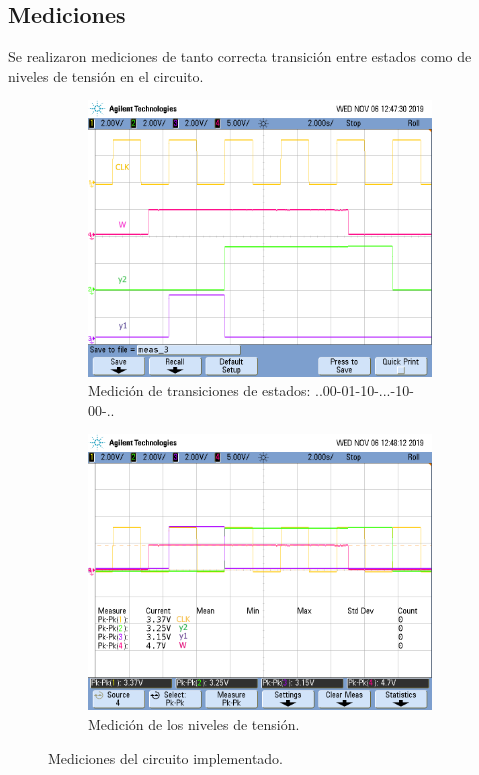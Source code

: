 \subsection{Mediciones}

Se realizaron mediciones de tanto correcta transición entre estados como de niveles de tensión en el circuito.

\begin{figure}[H]
\begin{subfigure}{0.49\textwidth}
\centering
\includegraphics[width=\textwidth,trim={0 3.35cm 0.1cm 1.75cm},clip]{ImagenesEjercicio3/states.png}
\caption{Medición de transiciones de estados: ..00-01-10-...-10-00-..}
\label{states1}
\end{subfigure}
\begin{subfigure}{0.49\textwidth}
\centering
\includegraphics[width=\textwidth,trim={0 3.35cm 0.1cm 1.75cm},clip]{ImagenesEjercicio3/vlevels_states.png}
\caption{Medición de los niveles de tensión.}
\end{subfigure}
\caption{Mediciones del circuito implementado.}
\end{figure}

